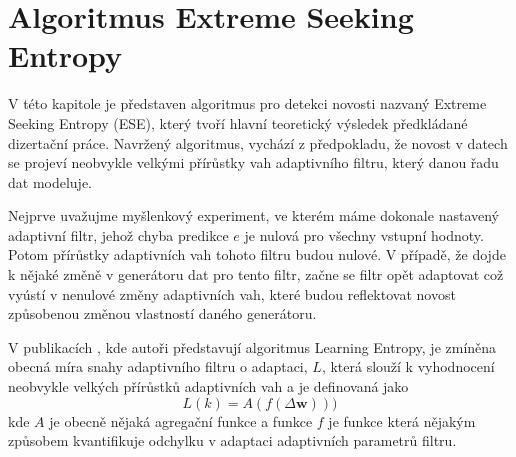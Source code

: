 \chapter{Algoritmus Extreme Seeking Entropy}\label{chap:ese}
V této kapitole je představen algoritmus pro detekci novosti nazvaný Extreme Seeking Entropy (ESE), který tvoří hlavní teoretický výsledek předkládané dizertační práce. Navržený algoritmus, vychází z předpokladu, že novost v datech se projeví neobvykle velkými přírůstky vah adaptivního filtru, který danou řadu dat modeluje.
\par Nejprve uvažujme myšlenkový experiment, ve kterém máme dokonale nastavený adaptivní filtr, jehož chyba predikce $e$ je nulová pro všechny vstupní hodnoty. Potom přírůstky adaptivních vah tohoto filtru budou nulové. V případě, že dojde k nějaké změně v generátoru dat pro tento filtr, začne se filtr opět adaptovat což vyústí v nenulové změny adaptivních vah, které budou reflektovat novost způsobenou změnou vlastností daného generátoru.
\par
V publikacích \cite{ivoLE1,ivoLE2}, kde autoři představují algoritmus Learning Entropy, je zmíněna obecná míra snahy adaptivního filtru o adaptaci, $L$, která slouží k vyhodnocení neobvykle velkých přírůstků adaptivních vah a je definovaná jako
\begin{equation}
L(k)=A(f(\Delta \textbf{w})))
\end{equation}
kde $A$ je obecně nějaká agregační funkce a funkce $f$ je funkce která nějakým způsobem kvantifikuje odchylku v adaptaci adaptivních parametrů filtru.

